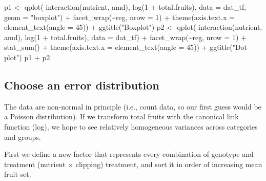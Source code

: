 \documentclass[
  12pt,
]{book}
\newenvironment{Shaded}{\begin{snugshade}}{\end{snugshade}}
\newcommand{\AttributeTok}[1]{\textcolor[rgb]{0.77,0.63,0.00}{#1}}
\newcommand{\DecValTok}[1]{\textcolor[rgb]{0.00,0.00,0.81}{#1}}
\newcommand{\FunctionTok}[1]{\textcolor[rgb]{0.00,0.00,0.00}{#1}}
\newcommand{\NormalTok}[1]{#1}
\newcommand{\OtherTok}[1]{\textcolor[rgb]{0.56,0.35,0.01}{#1}}
\newcommand{\SpecialCharTok}[1]{\textcolor[rgb]{0.00,0.00,0.00}{#1}}
\newcommand{\StringTok}[1]{\textcolor[rgb]{0.31,0.60,0.02}{#1}}
\begin{document}
\begin{Shaded}
\begin{Highlighting}[]
\NormalTok{p1 }\OtherTok{\textless{}{-}} \FunctionTok{qplot}\NormalTok{(}
    \FunctionTok{interaction}\NormalTok{(nutrient, amd),}
    \FunctionTok{log}\NormalTok{(}\DecValTok{1} \SpecialCharTok{+}\NormalTok{ total.fruits),}
    \AttributeTok{data =}\NormalTok{ dat\_tf, }\AttributeTok{geom =} \StringTok{"boxplot"}\NormalTok{) }\SpecialCharTok{+}
  \FunctionTok{facet\_wrap}\NormalTok{(}\SpecialCharTok{\textasciitilde{}}\NormalTok{reg, }\AttributeTok{nrow =} \DecValTok{1}\NormalTok{) }\SpecialCharTok{+}
  \FunctionTok{theme}\NormalTok{(}\AttributeTok{axis.text.x =} \FunctionTok{element\_text}\NormalTok{(}\AttributeTok{angle =} \DecValTok{45}\NormalTok{)) }\SpecialCharTok{+}
  \FunctionTok{ggtitle}\NormalTok{(}\StringTok{"Boxplot"}\NormalTok{)}
\NormalTok{p2 }\OtherTok{\textless{}{-}} \FunctionTok{qplot}\NormalTok{(}
    \FunctionTok{interaction}\NormalTok{(nutrient, amd),}
    \FunctionTok{log}\NormalTok{(}\DecValTok{1} \SpecialCharTok{+}\NormalTok{ total.fruits),}
    \AttributeTok{data =}\NormalTok{ dat\_tf) }\SpecialCharTok{+}
  \FunctionTok{facet\_wrap}\NormalTok{(}\SpecialCharTok{\textasciitilde{}}\NormalTok{reg, }\AttributeTok{nrow =} \DecValTok{1}\NormalTok{) }\SpecialCharTok{+}
  \FunctionTok{stat\_sum}\NormalTok{() }\SpecialCharTok{+}
  \FunctionTok{theme}\NormalTok{(}\AttributeTok{axis.text.x =} \FunctionTok{element\_text}\NormalTok{(}\AttributeTok{angle =} \DecValTok{45}\NormalTok{)) }\SpecialCharTok{+}
  \FunctionTok{ggtitle}\NormalTok{(}\StringTok{"Dot plot"}\NormalTok{)}
\NormalTok{p1 }\SpecialCharTok{+}\NormalTok{ p2}
\end{Highlighting}
\end{Shaded}

\hypertarget{choose-an-error-distribution}{%
\subsection{Choose an error distribution}\label{choose-an-error-distribution}}

The data are non-normal in principle (i.e., count data, so our first guess would be a Poisson distribution). If we transform total fruits with the canonical link function (log), we hope to see relatively homogeneous variances across categories and groups.

First we define a new factor that represents every combination of genotype and treatment (nutrient × clipping) treatment, and sort it in order of increasing mean fruit set.
\end{document}
